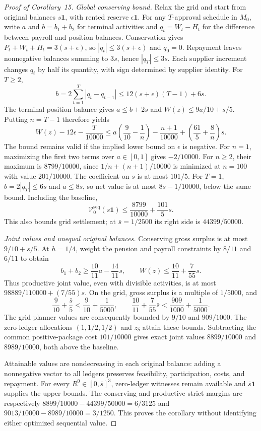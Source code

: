 \documentclass[ecta,draft,supplement]{econsocart}
\theoremstyle{definition}
\theoremstyle{definition}
\begin{document}
\begin{appendix}
\begin{proof}[Proof of Corollary~15%
]
\emph{Global conserving bound.}
Relax the grid and start from original balances $s\mathbf1$, with
rented reserve $\epsilon\mathbf1$. For any $T$-approval schedule in
$M_0$, write $a$ and $b=b_1+b_2$ for terminal activities and
$q_t=W_t-H_t$ for the difference between payroll and position balances.
Conservation gives $P_t+W_t+H_t=3(s+\epsilon)$, so
$|q_t|\leq3(s+\epsilon)$ and $q_0=0$. Repayment leaves nonnegative
balances summing to $3s$, hence $|q_T|\leq3s$. Each supplier
increment changes $q_t$ by half its quantity, with sign determined
by supplier identity. For $T\geq2$,
\[
 b=2\sum_{t=1}^T|q_t-q_{t-1}|
 \leq12(s+\epsilon)(T-1)+6s.
\]
The terminal position balance gives $a\leq b+2s$ and
$W(z)\leq9a/10+s/5$. Putting $n=T-1$ therefore yields
\[
 W(z)-12\epsilon-\frac{T}{10000}
 \leq a\left(\frac9{10}-\frac1n\right)
       -\frac{n+1}{10000}
       +\left(\frac{61}{5}+\frac8n\right)s.
\]
The bound remains valid if the implied lower bound on $\epsilon$
is negative. For $n=1$, maximizing the first two terms over
$a\in[0,1]$ gives $-2/10000$. For $n\geq2$, their maximum is
$8799/10000$, since $1/n+(n+1)/10000$ is minimized at $n=100$
with value $201/10000$. The coefficient on $s$ is at most $101/5$.
For $T=1$, $b=2|q_T|\leq6s$ and $a\leq8s$, so net value is at
most $8s-1/10000$, below the same bound. Including the baseline,
\[
 \mathcal V^{\mathrm{seq}}_0(s\mathbf1)
 \leq\frac{8799}{10000}+\frac{101}{5}s.
\]
This also bounds grid settlement; at $\bar s=1/2500$ its right
side is $44399/50000$.

\emph{Joint values and unequal original balances.}
Conserving gross surplus is at most $9/10+s/5$. At $h=1/4$, weight
the pension and payroll constraints by $8/11$ and $6/11$ to obtain
\[
 b_1+b_2\geq\frac{10}{11}a-\frac{14}{11}s,
 \qquad W(z)\leq\frac{10}{11}+\frac7{55}s.
\]
Thus productive joint value, even with divisible activities, is at
most $98889/110000+(7/55)s$. On the grid, gross surplus is a
multiple of $1/5000$, and
\[
 \frac9{10}+\frac{\bar s}{5}<\frac9{10}+\frac1{5000},
 \qquad
 \frac{10}{11}+\frac7{55}\bar s
 <\frac{909}{1000}+\frac1{5000}.
\]
The grid planner values are consequently bounded by $9/10$ and
$909/1000$. The zero-ledger allocations $(1,1/2,1/2)$ and
$z_\delta$ attain these bounds. Subtracting the common positive-package
cost $101/10000$ gives exact joint values $8899/10000$ and
$8989/10000$, both above the baseline.

Attainable values are nondecreasing in each original balance:
adding a nonnegative vector to all ledgers preserves feasibility,
participation, costs, and repayment. For every
$R^0\in[0,\bar s]^3$, zero-ledger witnesses remain available and
$\bar s\mathbf1$ supplies the upper bounds. The conserving and
productive strict margins are respectively
$8899/10000-44399/50000=6/3125$ and
$9013/10000-8989/10000=3/1250$. This proves the corollary without
identifying either optimized sequential value.
\end{proof}


\end{appendix}
\end{document}
